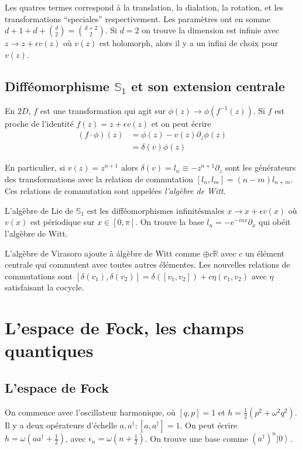 \documentclass[10pt]{report}
\newcommand{\ket}[1]{\left|#1\right>}
\begin{document}
Les quatres termes correspond \`a la translation, la dialation, la rotation, et les transformations ``speciales'' respectivement. Les param\`etres ont en somme $d + 1 + d + \binom{d}{2} = \binom{d+2}{2}$. Si $d = 2$ on trouve la dimension est infinie avec $z \to z + \epsilon v(z)$ o\`u $v(z)$ est holomorph, alors il y a un infini de choix pour $v(z)$.

\subsection{Diff\'eomorphisme $\mathbb{S}_1$ et son extension centrale}

En $2D$, $f$ est une transformation qui agit sur $\phi(z) \to \phi(f^{-1}(z))$. Si $f$ est proche de l'identit\'e $f(z) = z + \epsilon v(z)$ et on peut \'ecrire
\begin{align}
    (f \cdot \phi)(z) &= \phi(z) - v(z) \partial_z \phi(z)\\
    &= \delta(v)\phi(z)
\end{align}

En particulier, si $v(z) = z^{n+1}$ alors $\delta(v) = l_n \equiv -z^{n+1}\partial_z$ sont les g\'en\'erateurs des transformations avec la relation de commutation $\left[ l_n, l_m \right] = (n-m)l_{n+m}$. Ces relations de commutation sont appel\'ees \emph{l'alg\`ebre de Witt}.

L'alg\`ebre de Lie de $\mathbb{S}_1$ est les diff\'eomorphismes infinit\'esmales $x \to x + \epsilon v(x)$ o\`u $v(x)$ est p\'eriodique sur $x \in [0, \pi]$. On trouve la base $l_n = -e^{-inx}\partial_x$ qui ob\'eit l'alg\`ebre de Witt.

L'alg\`ebre de Virasoro ajoute \`a \'alg\`ebre de Witt comme $\oplus c\mathbb{R}$ avec $c$ un \'el\'ement centrale qui commutent avec toutes autres \'el\'ementes. Les nouvelles relations de commutations sont $[\delta (v_1), \delta(v_2)] = \delta([v_1, v_2]) + c\eta(v_1, v_2)$ avec $\eta$ satisfaisant la cocycle.

\section{L'espace de Fock, les champs quantiques}

\subsection{L'espace de Fock}

On commence avec l'oscillateur harmonique, o\`u $\left[ q,p \right] = 1$ et $h = \frac{1}{2}\left( p^2 + \omega^2 q^2 \right)$. Il y a deux op\'erateurs d'\'echelle $a, a^\dagger: \left[ a, a^\dagger \right] = 1$. On peut \'ecrire $h = \omega\left(a a^\dagger + \frac{1}{2}\right)$, avec $\epsilon_n = \omega\left( n + \frac{1}{2} \right)$. On trouve une base comme $(a^\dagger)^n\ket{0}$.
\end{document}

